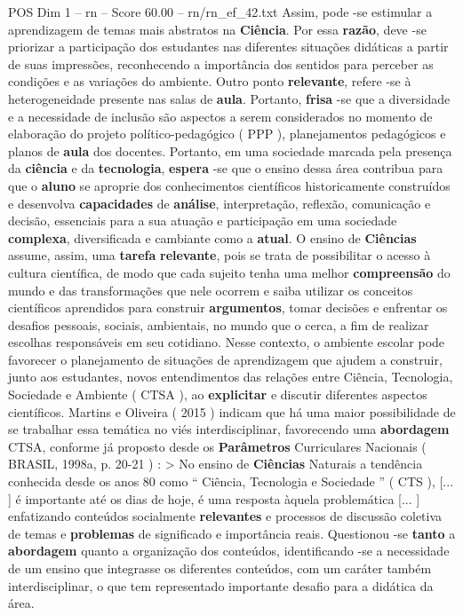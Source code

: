 \begin{textsample}{POS Dim 1 – rn – Score 60.00 – rn/rn\_ef\_42.txt}
Assim, pode -se estimular a aprendizagem de temas mais abstratos na \textbf{Ciência}.
Por essa \textbf{razão}, deve -se priorizar a participação dos estudantes nas diferentes situações didáticas a partir de suas impressões, reconhecendo a importância dos sentidos para perceber as condições e as variações do ambiente.
Outro ponto \textbf{relevante}, refere -se à heterogeneidade presente nas salas de \textbf{aula}.
Portanto, \textbf{frisa} -se que a diversidade e a necessidade de inclusão são aspectos a serem considerados no momento de elaboração do projeto político-pedagógico ( PPP ), planejamentos pedagógicos e planos de \textbf{aula} dos docentes.
Portanto, em uma sociedade marcada pela presença da \textbf{ciência} e da \textbf{tecnologia}, \textbf{espera} -se que o ensino dessa área contribua para que o \textbf{aluno} se aproprie dos conhecimentos científicos historicamente construídos e desenvolva \textbf{capacidades} de \textbf{análise}, interpretação, reflexão, comunicação e decisão, essenciais para a sua atuação e participação em uma sociedade \textbf{complexa}, diversificada e cambiante como a \textbf{atual}.
O ensino de \textbf{Ciências} assume, assim, uma \textbf{tarefa} \textbf{relevante}, pois se trata de possibilitar o acesso à cultura científica, de modo que cada sujeito tenha uma melhor \textbf{compreensão} do mundo e das transformações que nele ocorrem e saiba utilizar os conceitos científicos aprendidos para construir \textbf{argumentos}, tomar decisões e enfrentar os desafios pessoais, sociais, ambientais, no mundo que o cerca, a fim de realizar escolhas responsáveis em seu cotidiano.
Nesse contexto, o ambiente escolar pode favorecer o planejamento de situações de aprendizagem que ajudem a construir, junto aos estudantes, novos entendimentos das relações entre Ciência, Tecnologia, Sociedade e Ambiente ( CTSA ), ao \textbf{explicitar} e discutir diferentes aspectos científicos.
Martins e Oliveira ( 2015 ) indicam que há uma maior possibilidade de se trabalhar essa temática no viés interdisciplinar, favorecendo uma \textbf{abordagem} CTSA, conforme já proposto desde os \textbf{Parâmetros} Curriculares Nacionais ( BRASIL, 1998a, p. 20-21 ) : > No ensino de \textbf{Ciências} Naturais a tendência conhecida desde os anos 80 como “ Ciência, Tecnologia e Sociedade ” ( CTS ), [... ] é importante até os dias de hoje, é uma resposta àquela problemática [... ] enfatizando conteúdos socialmente \textbf{relevantes} e processos de discussão coletiva de temas e \textbf{problemas} de significado e importância reais.
Questionou -se \textbf{tanto} a \textbf{abordagem} quanto a organização dos conteúdos, identificando -se a necessidade de um ensino que integrasse os diferentes conteúdos, com um caráter também interdisciplinar, o que tem representado importante desafio para a didática da área.

\end{textsample}
